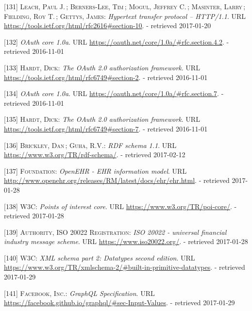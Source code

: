 \documentclass[12pt,english,a4paper,titlepage,cleardoublepage=empty,dottedtoc]{report}
\begin{document}
\hypertarget{ref-web_spec_http-error-codes}{}
{[}131{]} \textsc{Leach, Paul J.}\,; \textsc{Berners-Lee, Tim}\,;
\textsc{Mogul, Jeffrey C.}\,; \textsc{Masinter, Larry}\,;
\textsc{Fielding, Roy T.}\,; \textsc{Gettys, James}: \emph{Hypertext
transfer protocol -- HTTP/1.1}. URL
\url{https://tools.ietf.org/html/rfc2616\#section-10}. - retrieved
2017-01-20

\hypertarget{ref-web_spec_oauth-1a_client-reg}{}
{[}132{]} \emph{OAuth core 1.0a}. URL
\url{https://oauth.net/core/1.0a/\#rfc.section.4.2}. - retrieved
2016-11-01

\hypertarget{ref-web_spec_oauth-2_client-reg}{}
{[}133{]} \textsc{Hardt, Dick}: \emph{The OAuth 2.0 authorization
framework}. URL \url{https://tools.ietf.org/html/rfc6749\#section-2}. -
retrieved 2016-11-01

\hypertarget{ref-web_spec_oauth-1a_access-verification}{}
{[}134{]} \emph{OAuth core 1.0a}. URL
\url{https://oauth.net/core/1.0a/\#rfc.section.7}. - retrieved
2016-11-01

\hypertarget{ref-web_spec_oauth-2_access-verification}{}
{[}135{]} \textsc{Hardt, Dick}: \emph{The OAuth 2.0 authorization
framework}. URL \url{https://tools.ietf.org/html/rfc6749\#section-7}. -
retrieved 2016-11-01

\hypertarget{ref-web_w3c-tr_rdf-schemas}{}
{[}136{]} \textsc{Brickley, Dan}\,; \textsc{Guha, R.V.}: \emph{RDF
schema 1.1}. URL \url{https://www.w3.org/TR/rdf-schema/}. - retrieved
2017-02-12

\hypertarget{ref-web_spec_data-schemas_ehr}{}
{[}137{]} \textsc{Foundation}: \emph{OpenEHR - EHR information model}.
URL \url{http://www.openehr.org/releases/RM/latest/docs/ehr/ehr.html}. -
retrieved 2017-01-28

\hypertarget{ref-web_spec_data-schemas_poi}{}
{[}138{]} \textsc{W3C}: \emph{Points of interest core}. URL
\url{https://www.w3.org/TR/poi-core/}. - retrieved 2017-01-28

\hypertarget{ref-web_spec_data-schemas_bank-transfer}{}
{[}139{]} \textsc{Authority, ISO 20022 Registration}: \emph{ISO 20022 -
universal financial industry message scheme}. URL
\url{https://www.iso20022.org/}. - retrieved 2017-01-28

\hypertarget{ref-web_spec_xml_types}{}
{[}140{]} \textsc{W3C}: \emph{XML schema part 2: Datatypes second
edition}. URL
\url{https://www.w3.org/TR/xmlschema-2/\#built-in-primitive-datatypes}.
- retrieved 2017-01-29

\hypertarget{ref-web_spec_graphql_types}{}
{[}141{]} \textsc{Facebook, Inc.}: \emph{GraphQL Specification}. URL
\url{https://facebook.github.io/graphql/\#sec-Input-Values}. - retrieved
2017-01-29
\end{document}
